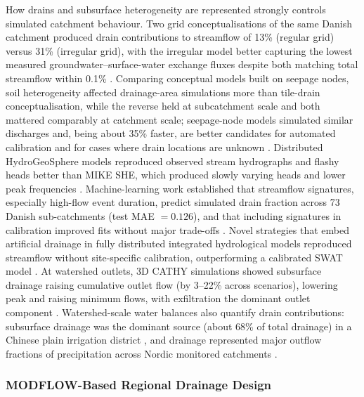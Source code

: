How drains and subsurface heterogeneity are represented strongly controls simulated catchment behaviour. Two grid conceptualisations of the same Danish catchment produced drain contributions to streamflow of 13\% (regular grid) versus 31\% (irregular grid), with the irregular model better capturing the lowest measured groundwater--surface-water exchange fluxes despite both matching total streamflow within 0.1\% \parencite{Karan2021}. Comparing conceptual models built on seepage nodes, soil heterogeneity affected drainage-area simulations more than tile-drain conceptualisation, while the reverse held at subcatchment scale and both mattered comparably at catchment scale; seepage-node models simulated similar discharges and, being about 35\% faster, are better candidates for automated calibration and for cases where drain locations are unknown \parencite{Boico2022}. Distributed HydroGeoSphere models reproduced observed stream hydrographs and flashy heads better than MIKE SHE, which produced slowly varying heads and lower peak frequencies \parencite{DeSchepper2017}. Machine-learning work established that streamflow signatures, especially high-flow event duration, predict simulated drain fraction across 73 Danish sub-catchments (test MAE $=0.126$), and that including signatures in calibration improved fits without major trade-offs \parencite{Schneider2022}. Novel strategies that embed artificial drainage in fully distributed integrated hydrological models reproduced streamflow without site-specific calibration, outperforming a calibrated SWAT model \parencite{Rathore2024}. At watershed outlets, 3D CATHY simulations showed subsurface drainage raising cumulative outlet flow (by 3--22\% across scenarios), lowering peak and raising minimum flows, with exfiltration the dominant outlet component \parencite{Muma2016}. Watershed-scale water balances also quantify drain contributions: subsurface drainage was the dominant source (about 68\% of total drainage) in a Chinese plain irrigation district \parencite{Zheng2025b}, and drainage represented major outflow fractions of precipitation across Nordic monitored catchments \parencite{Nousiainen2015,Turunen2013}.

\subsubsection{MODFLOW-Based Regional Drainage Design}

